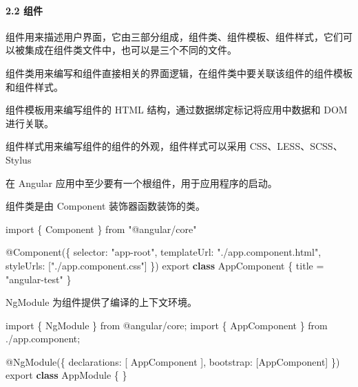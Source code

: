 \documentclass[
]{article}
\newenvironment{Shaded}{}{}
\newcommand{\DataTypeTok}[1]{\textcolor[rgb]{0.56,0.13,0.00}{#1}}
\newcommand{\FunctionTok}[1]{\textcolor[rgb]{0.02,0.16,0.49}{#1}}
\newcommand{\ImportTok}[1]{#1}
\newcommand{\KeywordTok}[1]{\textcolor[rgb]{0.00,0.44,0.13}{\textbf{#1}}}
\newcommand{\NormalTok}[1]{#1}
\newcommand{\OperatorTok}[1]{\textcolor[rgb]{0.40,0.40,0.40}{#1}}
\newcommand{\StringTok}[1]{\textcolor[rgb]{0.25,0.44,0.63}{#1}}
\begin{document}
\hypertarget{22-ux7ec4ux4ef6}{%
\paragraph{2.2 组件}\label{22-ux7ec4ux4ef6}}

组件用来描述用户界面，它由三部分组成，组件类、组件模板、组件样式，它们可以被集成在组件类文件中，也可以是三个不同的文件。

组件类用来编写和组件直接相关的界面逻辑，在组件类中要关联该组件的组件模板和组件样式。

组件模板用来编写组件的 HTML 结构，通过数据绑定标记将应用中数据和 DOM
进行关联。

组件样式用来编写组件的组件的外观，组件样式可以采用
CSS、LESS、SCSS、Stylus

在 Angular 应用中至少要有一个根组件，用于应用程序的启动。

组件类是由 Component 装饰器函数装饰的类。

\begin{Shaded}
\begin{Highlighting}[]
\ImportTok{import}\NormalTok{ \{ Component \} }\ImportTok{from} \StringTok{"@angular/core"}

\NormalTok{@}\FunctionTok{Component}\NormalTok{(\{}
  \DataTypeTok{selector}\OperatorTok{:} \StringTok{"app{-}root"}\OperatorTok{,}
  \DataTypeTok{templateUrl}\OperatorTok{:} \StringTok{"./app.component.html"}\OperatorTok{,}
  \DataTypeTok{styleUrls}\OperatorTok{:}\NormalTok{ [}\StringTok{"./app.component.css"}\NormalTok{]}
\NormalTok{\})}
\ImportTok{export} \KeywordTok{class}\NormalTok{ AppComponent \{}
\NormalTok{  title }\OperatorTok{=} \StringTok{"angular{-}test"}
\NormalTok{\}}
\end{Highlighting}
\end{Shaded}

NgModule 为组件提供了编译的上下文环境。

\begin{Shaded}
\begin{Highlighting}[]
\ImportTok{import}\NormalTok{ \{ NgModule \} }\ImportTok{from} \StringTok{\textquotesingle{}@angular/core\textquotesingle{}}\OperatorTok{;}
\ImportTok{import}\NormalTok{ \{ AppComponent \} }\ImportTok{from} \StringTok{\textquotesingle{}./app.component\textquotesingle{}}\OperatorTok{;}

\NormalTok{@}\FunctionTok{NgModule}\NormalTok{(\{}
  \DataTypeTok{declarations}\OperatorTok{:}\NormalTok{ [}
\NormalTok{    AppComponent}
\NormalTok{  ]}\OperatorTok{,}
  \DataTypeTok{bootstrap}\OperatorTok{:}\NormalTok{ [AppComponent]}
\NormalTok{\})}
\ImportTok{export} \KeywordTok{class}\NormalTok{ AppModule \{ \}}
\end{Highlighting}
\end{Shaded}
\end{document}
